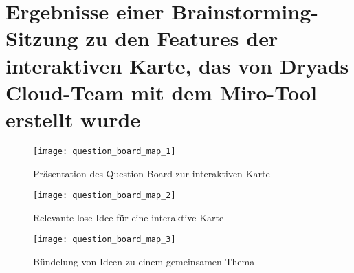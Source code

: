 \section{Ergebnisse einer Brainstorming-Sitzung zu den Features der interaktiven Karte, das von Dryads Cloud-Team mit dem Miro-Tool erstellt wurde} \label{appendix:question_board_map}

\begin{figure}[H]
  \centering
  \texttt{[image: question\_board\_map\_1]}
  \caption{Präsentation des Question Board zur interaktiven Karte}
  \label{fig:question_board_map_1}
\end{figure}
\begin{figure}[H]
  \centering
  \texttt{[image: question\_board\_map\_2]}
  \caption{Relevante lose Idee für eine interaktive Karte}
  \label{fig:question_board_map_2}
\end{figure}
\begin{figure}[H]
  \centering
  \texttt{[image: question\_board\_map\_3]}
  \caption{Bündelung von Ideen zu einem gemeinsamen Thema}
  \label{fig:question_board_map_3}
\end{figure}
